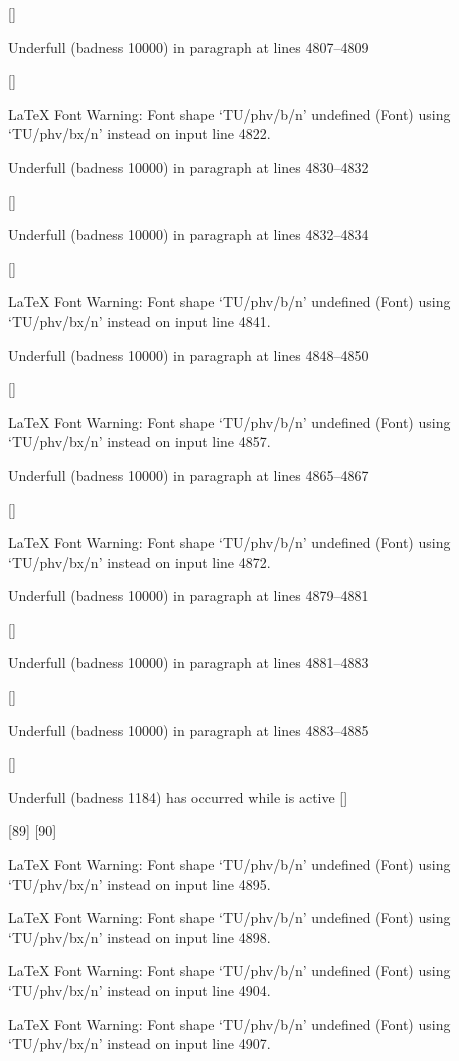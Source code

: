  []


Underfull \hbox (badness 10000) in paragraph at lines 4807--4809

 []


LaTeX Font Warning: Font shape `TU/phv/b/n' undefined
(Font)              using `TU/phv/bx/n' instead on input line 4822.


Underfull \hbox (badness 10000) in paragraph at lines 4830--4832

 []


Underfull \hbox (badness 10000) in paragraph at lines 4832--4834

 []


LaTeX Font Warning: Font shape `TU/phv/b/n' undefined
(Font)              using `TU/phv/bx/n' instead on input line 4841.


Underfull \hbox (badness 10000) in paragraph at lines 4848--4850

 []


LaTeX Font Warning: Font shape `TU/phv/b/n' undefined
(Font)              using `TU/phv/bx/n' instead on input line 4857.


Underfull \hbox (badness 10000) in paragraph at lines 4865--4867

 []


LaTeX Font Warning: Font shape `TU/phv/b/n' undefined
(Font)              using `TU/phv/bx/n' instead on input line 4872.


Underfull \hbox (badness 10000) in paragraph at lines 4879--4881

 []


Underfull \hbox (badness 10000) in paragraph at lines 4881--4883

 []


Underfull \hbox (badness 10000) in paragraph at lines 4883--4885

 []


Underfull \vbox (badness 1184) has occurred while \output is active []

[89] [90]

LaTeX Font Warning: Font shape `TU/phv/b/n' undefined
(Font)              using `TU/phv/bx/n' instead on input line 4895.


LaTeX Font Warning: Font shape `TU/phv/b/n' undefined
(Font)              using `TU/phv/bx/n' instead on input line 4898.


LaTeX Font Warning: Font shape `TU/phv/b/n' undefined
(Font)              using `TU/phv/bx/n' instead on input line 4904.


LaTeX Font Warning: Font shape `TU/phv/b/n' undefined
(Font)              using `TU/phv/bx/n' instead on input line 4907.


